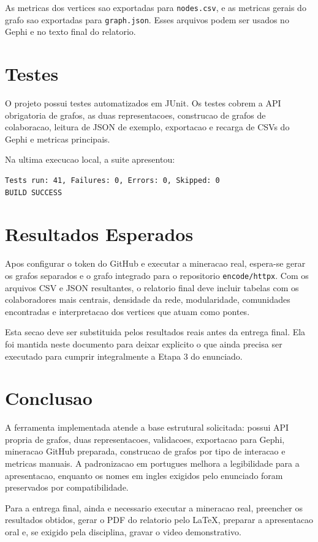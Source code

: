 \documentclass[12pt]{article}
\begin{document}
As metricas dos vertices sao exportadas para \texttt{nodes.csv}, e as metricas
gerais do grafo sao exportadas para \texttt{graph.json}. Esses arquivos podem
ser usados no Gephi e no texto final do relatorio.

\section{Testes}

O projeto possui testes automatizados em JUnit. Os testes cobrem a API
obrigatoria de grafos, as duas representacoes, construcao de grafos de
colaboracao, leitura de JSON de exemplo, exportacao e recarga de CSVs do Gephi
e metricas principais.

Na ultima execucao local, a suite apresentou:

\begin{verbatim}
Tests run: 41, Failures: 0, Errors: 0, Skipped: 0
BUILD SUCCESS
\end{verbatim}

\section{Resultados Esperados}

Apos configurar o token do GitHub e executar a mineracao real, espera-se gerar
os grafos separados e o grafo integrado para o repositorio \texttt{encode/httpx}.
Com os arquivos CSV e JSON resultantes, o relatorio final deve incluir tabelas
com os colaboradores mais centrais, densidade da rede, modularidade,
comunidades encontradas e interpretacao dos vertices que atuam como pontes.

Esta secao deve ser substituida pelos resultados reais antes da entrega final.
Ela foi mantida neste documento para deixar explicito o que ainda precisa ser
executado para cumprir integralmente a Etapa 3 do enunciado.

\section{Conclusao}

A ferramenta implementada atende a base estrutural solicitada: possui API
propria de grafos, duas representacoes, validacoes, exportacao para Gephi,
mineracao GitHub preparada, construcao de grafos por tipo de interacao e
metricas manuais. A padronizacao em portugues melhora a legibilidade para a
apresentacao, enquanto os nomes em ingles exigidos pelo enunciado foram
preservados por compatibilidade.

Para a entrega final, ainda e necessario executar a mineracao real, preencher
os resultados obtidos, gerar o PDF do relatorio pelo LaTeX, preparar a
apresentacao oral e, se exigido pela disciplina, gravar o video demonstrativo.



\end{document}

